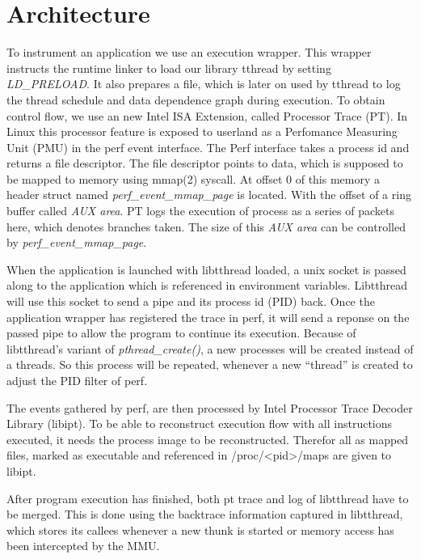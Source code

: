 \section{Architecture}
\label{sec:introduction}

To instrument an application we use an execution wrapper. This wrapper instructs
the runtime linker to load our library tthread by setting \emph{LD\_PRELOAD}. It
also prepares a file, which is later on used by tthread to log the thread
schedule and data dependence graph during execution. To obtain control flow, we
use an new Intel ISA Extension, called Processor Trace (PT). In Linux this
processor feature is exposed to userland as a Perfomance Measuring Unit (PMU) in
the perf event interface. The Perf interface takes a process id and returns a
file descriptor. The file descriptor points to data, which is supposed to be
mapped to memory using mmap(2) syscall. At offset 0 of this memory a header
struct named \emph{perf\_event\_mmap\_page} is located.
With the offset of a ring buffer called \emph{AUX area}. PT logs the execution
of process as a series of packets here, which denotes branches taken.
The size of this \emph{AUX area} can be controlled by \emph{perf\_event\_mmap\_page}.

When the application is launched with libtthread loaded, a unix socket is passed
along to the application which is referenced in environment variables.
Libtthread will use this socket to send a pipe and its process id (PID) back.
Once the application wrapper has registered the trace in perf, it will send a
reponse on the passed pipe to allow the program to continue its execution.
Because of libtthread's variant of \emph{pthread\_create()}, a new processes
will be created instead of a threads. So this process will be repeated, whenever
a new "`thread"' is created to adjust the PID filter of perf.

The events gathered by perf, are then processed by Intel Processor Trace Decoder
Library (libipt). To be able to reconstruct execution flow with all
instructions executed, it needs the process image to be reconstructed. Therefor
all as mapped files, marked as executable and referenced in /proc/<pid>/maps are
given to libipt.

After program execution has finished, both pt trace and log of libtthread have
to be merged. This is done using the backtrace information captured in
libtthread, which stores its callees whenever a new thunk is started or memory
access has been intercepted by the MMU.
